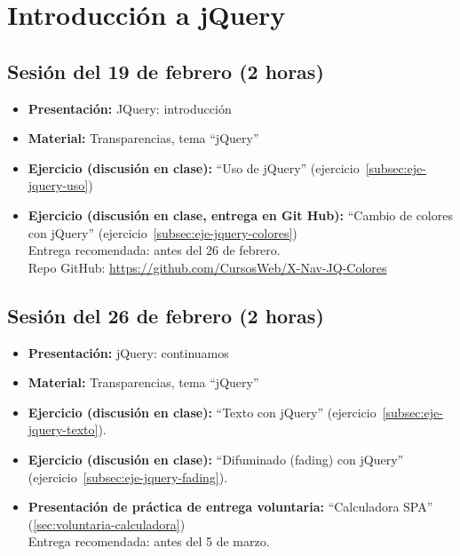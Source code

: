 \documentclass[a4paper,12pt]{report}
\begin{document}
\section{Introducción a jQuery}

\subsection{Sesión del 19 de febrero (2 horas)}

\begin{itemize}
\item \textbf{Presentación:} JQuery: introducción
\item \textbf{Material:} Transparencias, tema ``jQuery''
\item \textbf{Ejercicio (discusión en clase):} ``Uso de jQuery'' (ejercicio~\ref{subsec:eje-jquery-uso})
\item \textbf{Ejercicio (discusión en clase, entrega en Git Hub):} ``Cambio de colores con jQuery'' (ejercicio~\ref{subsec:eje-jquery-colores}) \\
  Entrega recomendada: antes del 26 de febrero.  \\
  Repo GitHub: \url{https://github.com/CursosWeb/X-Nav-JQ-Colores} \\
\end{itemize}

\subsection{Sesión del 26 de febrero (2 horas)}

\begin{itemize}
\item \textbf{Presentación:} jQuery: continuamos
\item \textbf{Material:} Transparencias, tema ``jQuery''
\item \textbf{Ejercicio (discusión en clase):} ``Texto con jQuery'' (ejercicio~\ref{subsec:eje-jquery-texto}).
\item \textbf{Ejercicio (discusión en clase):} ``Difuminado (fading) con jQuery'' (ejercicio~\ref{subsec:eje-jquery-fading}).
\item \textbf{Presentación de práctica de entrega voluntaria:} ``Calculadora SPA'' (\ref{sec:voluntaria-calculadora}) \\
  Entrega recomendada: antes del 5 de marzo.
\end{itemize}
\end{document}
